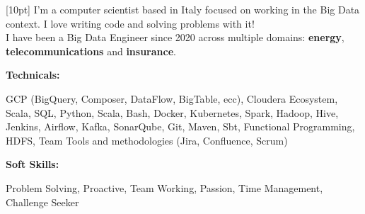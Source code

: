 \documentclass[9pt]{developercv} %
\begin{document}
    \begin{minipage}[t]{0.46\textwidth}
        [10pt] I'm a computer scientist based in Italy focused on working in the Big Data context. I love writing code and solving problems with it! \\ I have been a Big Data Engineer since 2020 across multiple domains: \textbf{energy}, \textbf{telecommunications} and \textbf{insurance}.\\
    \end{minipage}
    \hfill %
    \begin{minipage}[t]{0.465\textwidth}
        \vspace{-6pt}

        \begin{minipage}[t]{0.2\textwidth}
            \textbf{Technicals:}
        \end{minipage}
        \hfill
        \begin{minipage}[t]{0.73\textwidth}
            \small
            GCP (BigQuery, Composer, DataFlow, BigTable, ecc), Cloudera Ecosystem, Scala, SQL, Python, Scala, Bash, Docker, Kubernetes, Spark, Hadoop, Hive, Jenkins, Airflow, Kafka, SonarQube, Git, Maven, Sbt, Functional Programming, HDFS, Team Tools and methodologies (Jira, Confluence, Scrum)
        \end{minipage}
        \vspace{4mm}

        \begin{minipage}[t]{0.2\textwidth}
            \textbf{Soft Skills:}
        \end{minipage}
        \hfill
        \begin{minipage}[t]{0.73\textwidth}
            \small
            Problem Solving, Proactive, Team Working, Passion, Time Management, Challenge Seeker
        \end{minipage}

    \end{minipage}
\end{document}
